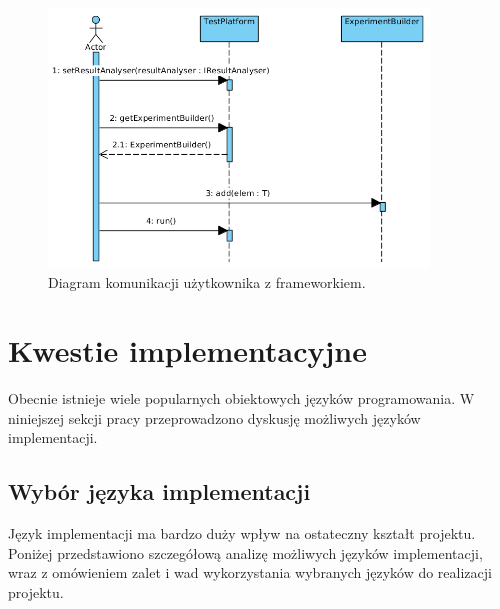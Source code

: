 \documentclass[12pt]{article}
\begin{document}
\begin{figure}
	\centering
	\includegraphics[width=0.9\textwidth]{img/sequenceUser.png}
	\caption{Diagram komunikacji użytkownika z frameworkiem.}
	\label{fig:sequenceUser}
\end{figure}



\section{Kwestie implementacyjne}

Obecnie istnieje wiele popularnych obiektowych języków programowania. W niniejszej sekcji pracy przeprowadzono dyskusję możliwych języków implementacji.

\subsection{Wybór języka implementacji}

Język implementacji ma bardzo duży wpływ na ostateczny kształt projektu. Poniżej przedstawiono szczegółową analizę możliwych języków implementacji, wraz z omówieniem zalet i wad wykorzystania wybranych języków do realizacji projektu.
\end{document}
